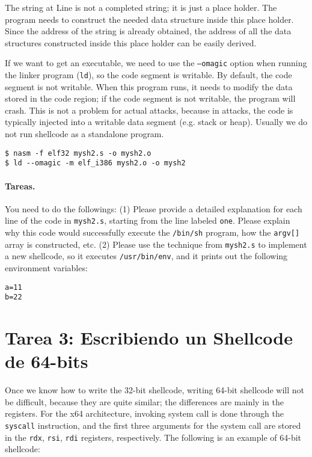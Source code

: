 The string at Line  is not a completed string; it 
is just a place holder. 
The program needs to construct the needed data structure
inside this place holder. Since the address of the string
is already obtained, the address of all the data 
structures constructed inside this place holder can
be easily derived. 


If we want to get an executable, we need to use 
the \texttt{--omagic} option when running the 
linker program (\texttt{ld}), so 
the code segment is writable. 
By default, the code segment is not writable.
When this program runs, it needs to modify the data stored
in the code region; if the code segment is not 
writable, the program will crash. 
This is not a problem for actual attacks, because
in attacks, the code is typically injected into a writable data 
segment (e.g. stack or heap). Usually we do not run shellcode 
as a standalone program. 


\begin{lstlisting}
$ nasm -f elf32 mysh2.s -o mysh2.o
$ ld --omagic -m elf_i386 mysh2.o -o mysh2
\end{lstlisting}


\paragraph{Tareas.} You need to do the followings:
(1) Please provide a detailed explanation for each line of the 
code in \texttt{mysh2.s}, starting from the line labeled \texttt{one}.
Please explain why this code would successfully execute 
the \texttt{/bin/sh} program, how the \texttt{argv[]} array is
constructed, etc. 
(2) Please use the technique from \texttt{mysh2.s} to 
implement a new shellcode, so it 
executes \texttt{/usr/bin/env}, and it prints out 
the following environment variables: 

\begin{lstlisting}
a=11
b=22
\end{lstlisting}


\section{Tarea 3: Escribiendo un Shellcode de 64-bits}

Once we know how to write the 32-bit shellcode, writing 64-bit
shellcode will not be difficult, because they are quite similar;
the differences are mainly in the registers. 
For the x64 architecture, invoking system call is done through
the \texttt{syscall} instruction, and the first three arguments 
for the system call are stored in the \texttt{rdx}, \texttt{rsi}, 
\texttt{rdi} registers, respectively. 
The following is an example of 64-bit shellcode:

